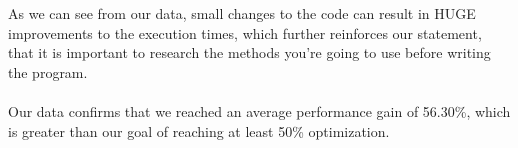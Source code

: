 As we can see from our data, small changes to the code can result in HUGE improvements to the execution times, which further reinforces our statement, that it is important to research the methods you're going to use before writing the program.\\\\

Our data confirms that we reached an average performance gain of 56.30\%, which is greater than our goal of reaching at least 50\% optimization.